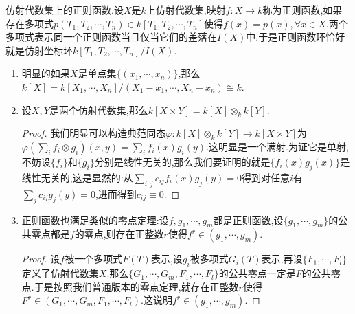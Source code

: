 仿射代数集上的正则函数.设$X$是$k$上仿射代数集,映射$f:X\to k$称为正则函数,如果存在多项式$p(T_1,T_2,\cdots,T_n)\in k[T_1,T_2,\cdots,T_n]$使得$f(x)=p(x),\forall x\in X$.两个多项式表示同一个正则函数当且仅当它们的差落在$I(X)$中.于是正则函数环恰好就是仿射坐标环$k[T_1,T_2,\cdots,T_n]/I(X)$.
\begin{enumerate}
	\item 明显的如果$X$是单点集$\{(x_1,\cdots,x_n)\}$,那么$k[X]=k[X_1,\cdots,X_n]/(X_1-x_1,\cdots,X_n-x_n)\cong k$.
	\item 设$X,Y$是两个仿射代数集,那么$k[X\times Y]=k[X]\otimes_kk[Y]$.
	\begin{proof}
		
		我们明显可以构造典范同态$\varphi:k[X]\otimes_kk[Y]\to k[X\times Y]$为$\varphi(\sum_if_i\otimes g_i)(x,y)=\sum_if_i(x)g_i(y)$.这明显是一个满射.为证它是单射,不妨设$\{f_i\}$和$\{g_i\}$分别是线性无关的,那么我们要证明的就是$\{f_i(x)g_j(x)\}$是线性无关的,这是显然的:从$\sum_{i,j}c_{ij}f_i(x)g_j(y)=0$得到对任意$i$有$\sum_jc_{ij}g_j(y)=0$,进而得到$c_{ij}\equiv0$.
	\end{proof}
	\item 正则函数也满足类似的零点定理:设$f,g_1,\cdots,g_m$都是正则函数,设$\{g_1,\cdots,g_m\}$的公共零点都是$f$的零点,则存在正整数$r$使得$f^r\in(g_1,\cdots,g_m)$.
	\begin{proof}
		
		设$f$被一个多项式$F(T)$表示,设$g_i$被多项式$G_i(T)$表示,再设$\{F_1,\cdots,F_l\}$定义了仿射代数集$X$.那么$\{G_1,\cdots,G_m,F_1,\cdots,F_l\}$的公共零点一定是$F$的公共零点.于是按照我们普通版本的零点定理,就存在正整数$r$使得$F^r\in(G_1,\cdots,G_m,F_1,\cdots,F_l)$.这说明$f^r\in(g_1,\cdots,g_m)$.
	\end{proof}
\end{enumerate}

